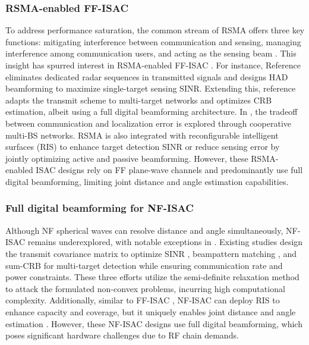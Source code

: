 \subsubsection{RSMA-enabled FF-ISAC} To address performance saturation, the common stream of RSMA offers three key functions: mitigating interference between communication and sensing, managing interference among communication users, and acting as the sensing beam \cite{9531484}. This insight has spurred interest in RSMA-enabled FF-ISAC \cite{gong2024hybrid,10486996,10032141,10522473,10287099}. For instance, Reference \cite{gong2024hybrid} eliminates dedicated radar sequences in transmitted signals and designs HAD beamforming to maximize single-target sensing SINR. Extending this, reference \cite{10486996} adapts the transmit scheme to multi-target networks and optimizes CRB estimation, albeit using a full digital beamforming architecture. In \cite{10032141}, the tradeoff between communication and localization error is explored through cooperative multi-BS networks. RSMA is also integrated with reconfigurable intelligent surfaces (RIS) to enhance target detection SINR \cite{10287099} or reduce sensing error \cite{10522473} by jointly optimizing active and passive beamforming. However, these RSMA-enabled ISAC designs rely on FF plane-wave channels and predominantly use full digital beamforming, limiting joint distance and angle estimation capabilities.

\subsubsection{Full digital beamforming for NF-ISAC}
Although NF spherical waves can resolve distance and angle simultaneously, NF-ISAC remains underexplored, with notable exceptions in \cite{10520715,10694020,hua2024near,10681603,10135096,meng2024hybrid,10700785,10579914}. Existing studies design the transmit covariance matrix to optimize SINR \cite{10520715}, beampattern matching \cite{10694020}, and sum-CRB \cite{hua2024near} for multi-target detection while ensuring communication rate and power constraints. These three efforts utilize the semi-definite relaxation method to attack the formulated non-convex problems, incurring high computational complexity\cite{10520715,10694020,hua2024near}. Additionally, similar to FF-ISAC \cite{10287099,10522473}, NF-ISAC can deploy RIS to enhance capacity and coverage, but it uniquely enables joint distance and angle estimation \cite{10681603}. However, these NF-ISAC designs use full digital beamforming, which poses significant hardware challenges due to RF chain demands. 

